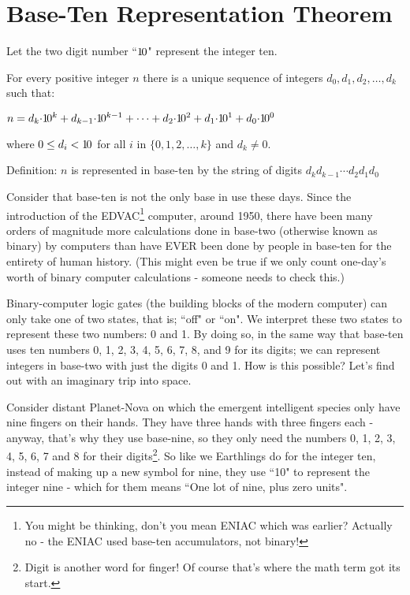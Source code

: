 \documentclass{article}
\newenvironment{jprIn}{\begin{adjustwidth}{2em}{}}{\end{adjustwidth}}
\begin{document}
\section*{Base-Ten Representation Theorem}
\begin{jprIn}
Let the two digit number ``${1\hspace{-0.12em}0}$" represent the integer ten.

For every positive integer $n$ there is a unique
sequence of integers $d_0, d_1, d_2,\dots{},d_k$ such that:

\hspace{3em}$n=d_k{\cdot}{1\hspace{-0.12em}0}^k+d_{k-1}{\cdot}{1\hspace{-0.12em}0}^{k-1}+\dots+d_2{\cdot}{1\hspace{-0.12em}0}^2+d_1{\cdot}{1\hspace{-0.12em}0}^1+d_0{\cdot}{1\hspace{-0.12em}0}^0$

where $0\le{}d_i<{1\hspace{-0.12em}0}$ for all $i$ in $\{0,1,2,\dots{},k\}$ and $d_k\ne0$.

Definition: $n$ is represented in base-ten by the string of digits $d_kd_{k-1}{\cdots}d_2d_1d_0$
\end{jprIn}
\bigskip

\break
Consider that base-ten is not the only base in use these days.
Since the introduction of the EDVAC\footnote{You might be thinking, don't you
mean ENIAC which was earlier? Actually no - the ENIAC
used base-ten accumulators, not binary!} computer, around 1950,
there have been many orders of magnitude more calculations done
in base-two (otherwise known as binary) by computers than have EVER
been done by people in base-ten for the entirety of human history.
(This might even be true if we only count one-day's worth of
binary computer calculations - someone needs to check this.)

Binary-computer logic gates (the building blocks of the modern computer)
can only take one of two states, that is; ``off" or ``on".
We interpret these two states to represent these two numbers: 0 and 1.
By doing so, in the same way that base-ten uses ten numbers 0,
1, 2, 3, 4, 5, 6, 7, 8, and 9 for its digits; we can represent integers
in base-two with just the digits 0 and 1. How is this possible?
Let's find out with an imaginary trip into space.

Consider distant Planet-Nova on which the emergent
intelligent species only have nine fingers on their hands.
They have three hands with three fingers each - anyway,
that's why they use base-nine, so they only need the numbers 0,
1, 2, 3, 4, 5, 6, 7 and 8 for their digits\footnote{Digit
is another word for finger! Of course that's where the math term got its start.}.
So like we Earthlings do for the integer ten,
instead of making up a new symbol for nine,
they use ``10" to represent the integer nine - which
for them means ``One lot of nine, plus zero units".
\end{document}

